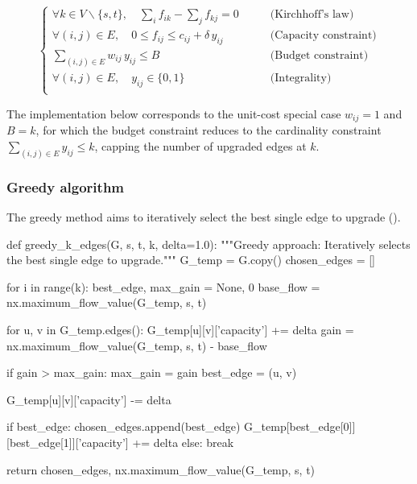 \documentclass[12pt, openany]{article}
\begin{document}
\begin{equation}
    \begin{cases}
        \forall k \in V \backslash \{s,t\}, \quad \sum_i f_{ik} - \sum_j f_{kj} = 0 \qquad &\text{(Kirchhoff's law)} \\
        \forall (i,j) \in E, \quad 0 \leq f_{ij} \leq c_{ij} + \delta\, y_{ij} \qquad &\text{(Capacity constraint)} \\
        \sum_{(i,j) \in E} w_{ij}\, y_{ij} \leq B \qquad &\text{(Budget constraint)} \\
        \forall (i,j) \in E, \quad y_{ij} \in \{0,1\} \qquad &\text{(Integrality)} \\
    \end{cases}
\end{equation}

The implementation below corresponds to the unit-cost special case $w_{ij} = 1$ and $B = k$, for which the budget constraint reduces to the cardinality constraint $\sum_{(i,j) \in E} y_{ij} \leq k$, capping the number of upgraded edges at $k$.

\subsubsection{Greedy algorithm}

The greedy method aims to iteratively select the best single edge to upgrade ().

\begin{python}[caption={Python code for the greedy approach in order to identify the sequence of $k$ edges under budget constraint},  label={lst:3_greedy_method_lst}]
def greedy_k_edges(G, s, t, k, delta=1.0):
    """Greedy approach: Iteratively selects the best single edge to upgrade."""
    G_temp = G.copy()
    chosen_edges = []
    
    for i in range(k):
        best_edge, max_gain = None, 0
        base_flow = nx.maximum_flow_value(G_temp, s, t)
        
        for u, v in G_temp.edges():
            G_temp[u][v]['capacity'] += delta
            gain = nx.maximum_flow_value(G_temp, s, t) - base_flow
            
            if gain > max_gain:
                max_gain = gain
                best_edge = (u, v)
                
            G_temp[u][v]['capacity'] -= delta
            
        if best_edge:
            chosen_edges.append(best_edge)
            G_temp[best_edge[0]][best_edge[1]]['capacity'] += delta
        else:
            break
            
    return chosen_edges, nx.maximum_flow_value(G_temp, s, t)


\end{python}
\end{document}
